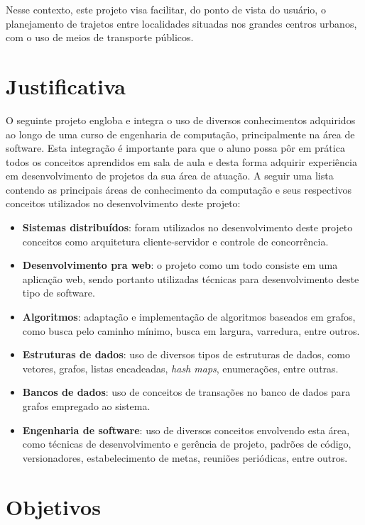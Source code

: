 Nesse contexto, este projeto visa facilitar, do ponto de vista do usuário, o planejamento de trajetos entre localidades situadas nos grandes centros urbanos, com o uso de meios de transporte públicos.

\section{Justificativa}
O seguinte projeto engloba e integra o uso de diversos conhecimentos adquiridos ao longo de uma curso de engenharia de computação, principalmente na área de software.
Esta integração é importante para que o aluno possa pôr em prática todos os conceitos aprendidos em sala de aula e desta forma adquirir experiência em desenvolvimento de projetos da sua área de atuação.
A seguir uma lista contendo as principais áreas de conhecimento da computação e seus respectivos conceitos utilizados no desenvolvimento deste projeto:

\begin{itemize}
	\item \textbf{Sistemas distribuídos}: foram utilizados no desenvolvimento deste projeto conceitos como arquitetura cliente-servidor e controle de concorrência.
	\item \textbf{Desenvolvimento pra web}: o projeto como um todo consiste em uma aplicação web, sendo portanto utilizadas técnicas para desenvolvimento deste tipo de 	software.
	\item \textbf{Algoritmos}: adaptação e implementação de algoritmos baseados em grafos, como busca pelo caminho mínimo, busca em largura, varredura, entre outros.
	\item \textbf{Estruturas de dados}: uso de diversos tipos de estruturas de dados, como vetores, grafos, listas encadeadas, \emph{hash maps}, enumerações, entre 		outras.
	\item \textbf{Bancos de dados}: uso de conceitos de transações no banco de dados para grafos empregado ao sistema. 
	\item \textbf{Engenharia de software}: uso de diversos conceitos envolvendo esta área, como técnicas de desenvolvimento e gerência de projeto, padrões de código, 		versionadores, estabelecimento de metas, reuniões periódicas, entre outros.
\end{itemize}

\section{Objetivos}

